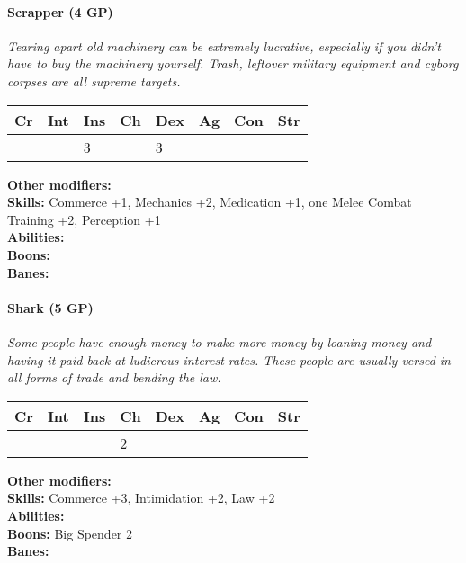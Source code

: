 \paragraph*{Scrapper (4 GP)}
\textit{Tearing apart old machinery can be extremely lucrative, especially if you didn't have to buy the machinery yourself. Trash, leftover military equipment and cyborg corpses are all supreme targets.}\par
\begin{tabular}{|l|l|l|l|l|l|l|l|}
    \hline
    Cr & Int & Ins & Ch & Dex & Ag & Con & Str \\ \hline
    &  & 3 &  & 3 &  &  &  \\ \hline
\end{tabular}\par
\noindent\textbf{Other modifiers:} \\
\textbf{Skills:} Commerce +1, Mechanics +2, Medication +1, one Melee Combat Training +2, Perception +1\\
\textbf{Abilities:} \\
\textbf{Boons:} \\
\textbf{Banes:} \\

\hrulefill
\paragraph*{Shark (5 GP)}
\textit{Some people have enough money to make more money by loaning money and having it paid back at ludicrous interest rates. These people are usually versed in all forms of trade and bending the law.}\par
\begin{tabular}{|l|l|l|l|l|l|l|l|}
	\hline
	Cr & Int & Ins & Ch & Dex & Ag & Con & Str \\ \hline
	&  &  & 2 &  &  &  &  \\ \hline
\end{tabular}\par
\noindent\textbf{Other modifiers:} \\
\textbf{Skills:} Commerce +3,
Intimidation +2,
Law +2\\
\textbf{Abilities:} \\
\textbf{Boons:} Big Spender 2 \\
\textbf{Banes:} \\

\hrulefill
